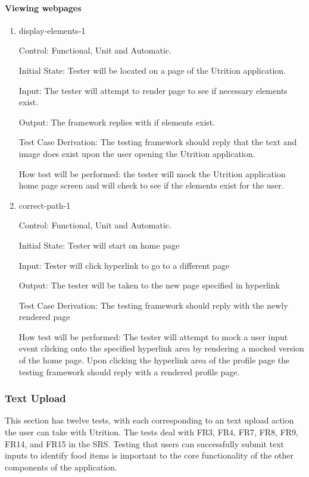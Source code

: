 \documentclass[12pt, titlepage]{article}
\begin{document}
	\paragraph{Viewing webpages}

	\begin{enumerate}
		\item{display-elements-1\\}
		
		Control: Functional, Unit and Automatic.
		
		Initial State: Tester will be located on a page of the Utrition application.
		
		Input: The tester will attempt to render page to see if necessary elements exist.
		
		Output: The framework replies with if elements exist.
		
		Test Case Derivation: The testing framework should reply that the text and image does exist upon the user opening the Utrition application.
		
		How test will be performed: the tester will mock the Utrition application home page screen and will check to see if the elements exist for the user.
		
		\item{correct-path-1\\}
		
		Control: Functional, Unit and Automatic.
		
		Initial State: Tester will start on home page
		
		Input: Tester will click hyperlink to go to a different page
		
		Output: The tester will be taken to the new page specified in hyperlink
		
		Test Case Derivation: The testing framework should reply with the newly rendered page
		
		How test will be performed: The tester will attempt to mock a user input event clicking onto the specified hyperlink area by rendering a mocked version of the home page. Upon clicking the hyperlink area of the profile page the testing framework should reply with a rendered profile page.
	\end{enumerate}

	\subsubsection{Text Upload}
	This section has twelve tests, with each corresponding to an text upload action the user can take with Utrition. The tests deal with FR3, FR4, FR7, FR8, FR9, FR14, and FR15 in the SRS. Testing that users can successfully submit text inputs to identify food items is 
	important to the core functionality of the other components of the 
	application.
	
\end{document}
